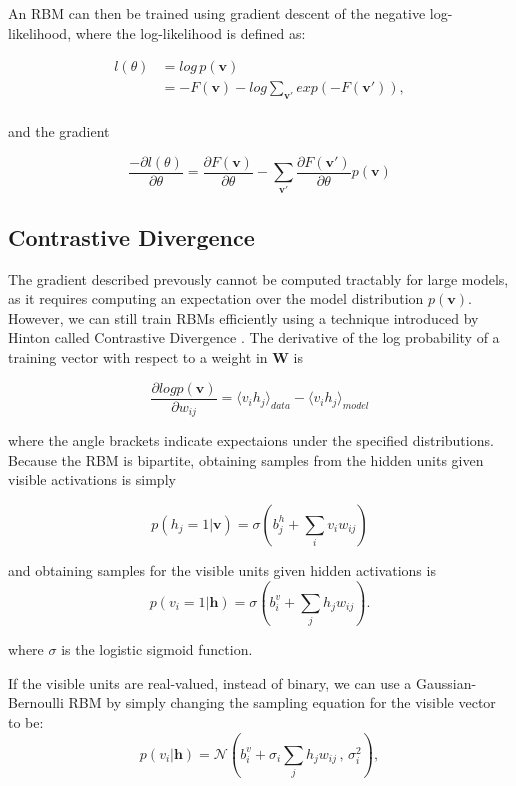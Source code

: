 \documentclass{article}
\begin{document}
An RBM can then be trained using gradient descent of the negative
log-likelihood, where the log-likelihood is defined as:

\begin{align*}
  l(\theta) &= log \, p(\mathbf{v}) \\
            &= -F(\mathbf{v}) - log \sum_{\mathbf{v'}} exp (-F(\mathbf{v'})), \\
\end{align*}

and the gradient

\[
  \frac{- \partial l(\theta)}{\partial \theta}
  = \frac{\partial F(\mathbf{v})}{\partial \theta} - 
  \sum_{\mathbf{v'}}\frac{\partial F(\mathbf{v'})}{\partial \theta}
                  p(\mathbf{v})
\]

\subsection{Contrastive Divergence}

The gradient described prevously cannot be computed tractably for large models,
as it requires computing an expectation over the model distribution
$p(\mathbf{v})$.  However, we can still train RBMs efficiently using a
technique introduced by Hinton called Contrastive Divergence
\cite{hinton_contrastivedivergence}. The derivative of the log probability of a
training vector with respect to a weight in $\mathbf{W}$ is 

\[
  \frac{\partial log p(\mathbf{v})}{\partial w_{ij}} = 
  \langle v_i h_j \rangle_{data} - \langle v_i h_j \rangle_{model}
\]

where the angle brackets indicate expectaions under the specified distributions.
Because the RBM is bipartite, obtaining samples from the hidden units given
visible activations is simply

\[
  p (h_j = 1 | \mathbf{v}) = \sigma(b_{j}^{h} + \sum_i v_{i} w_{ij})
\]

and obtaining samples for the visible units given hidden activations is
\[
  p (v_i = 1 | \mathbf{h}) = \sigma(b_{i}^{v} + \sum_j h_j w_{ij}).
\]

where $\sigma$ is the logistic sigmoid function.

If the visible units are real-valued, instead of binary, we can use a
Gaussian-Bernoulli RBM by simply changing the sampling equation for the visible
vector to be:
\[
  p (v_i | \mathbf{h}) = \mathcal{N} \left( b_{i}^{v} +
    \sigma_i \sum_j h_j w_{ij} \,,\, \sigma_i^2 \right),
\]
\end{document}
